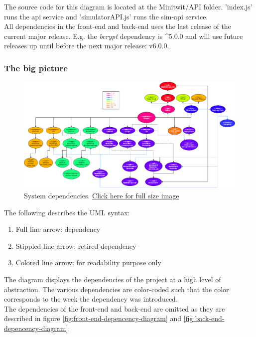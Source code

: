 The source code for this diagram is located at the Minitwit/API folder. 'index.js' runs the api service and 'simulatorAPI.js' runs the sim-api service.\\
All dependencies in the front-end and back-end uses the last release of the current major release. E.g. the \textit{bcrypt} dependency is \string^5.0.0 and will use future releases up until before the next major release: v6.0.0.

\subsubsection{The big picture}


\begin{figure}[H]
    \centering
    \includegraphics[scale=0.25]{report/images/system-dependencies.png}
    \caption{System dependencies. \href{https://github.com/Niels-Frederik/MiniTwit/blob/main/report/images/system-dependencies.png}{Click here for full size image}}
    \label{fig:system-depencencies}
\end{figure}

The following describes the UML syntax:
\begin{enumerate}
    \item Full line arrow: dependency
    \item Stippled line arrow: retired dependency
    \item Colored line arrow: for readability purpose only
\end{enumerate}
The diagram displays the dependencies of the project at a high level of abstraction. The various dependencies are color-coded such that the color corresponds to the week the dependency was introduced. 
\\
The dependencies of the front-end and back-end are omitted as they are described in figure \ref{fig:front-end-depencency-diagram} and \ref{fig:back-end-depencency-diagram}.


